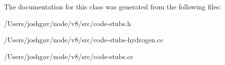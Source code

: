 The documentation for this class was generated from the following files\+:\begin{DoxyCompactItemize}
\item 
/\+Users/joshgav/node/v8/src/code-\/stubs.\+h\item 
/\+Users/joshgav/node/v8/src/code-\/stubs-\/hydrogen.\+cc\item 
/\+Users/joshgav/node/v8/src/code-\/stubs.\+cc\end{DoxyCompactItemize}
